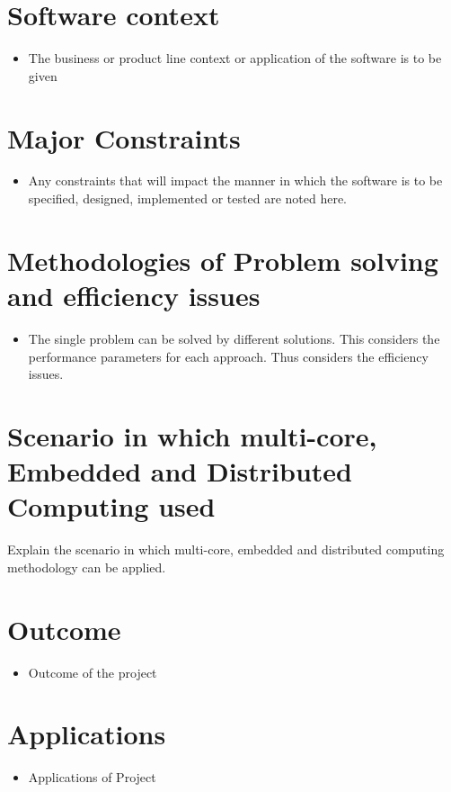 \documentclass[oneside,a4paper,12pt]{report}
\begin{document}
\section{Software context} 
\begin{itemize}
\item The business or product line context or application of the software is to be given
\end{itemize}
\section{Major Constraints}
\begin{itemize}
\item Any constraints that will impact the manner in which the software is to be specified, designed, implemented or tested are noted here.
\end{itemize}

\section{Methodologies of Problem solving and efficiency issues}
\begin{itemize}
	\item The single problem can be solved by different solutions.  This considers the performance parameters for each approach. Thus considers the efficiency issues.
\end{itemize}

\section{Scenario in which multi-core, Embedded and Distributed Computing used}
 Explain the scenario in which multi-core, embedded and distributed computing methodology can be applied.


\section{Outcome}
\begin{itemize}
\item Outcome of the project
\end{itemize}

\section{Applications}
\begin{itemize}
\item Applications of Project
\end{itemize}
\end{document}
